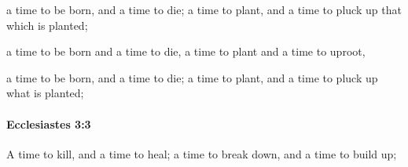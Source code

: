 			\begin{versebox}
					\item[BHS] 
					\item[LXX] 
					\item[ASV] a time to be born, and a time to die; a time to plant, and a time to pluck up that which is planted;
					\item[NIV] a time to be born and a time to die, a time to plant and a time to uproot,
					\item[NRSV] a time to be born, and a time to die; a time to plant, and a time to pluck up what is planted;
			\end{versebox}

		\paragraph{Ecclesiastes 3:3} %
			\label{ECCLESIASTES-3-3}

			A time to kill, and a time to heal; a time to break down, and a time to build up;

